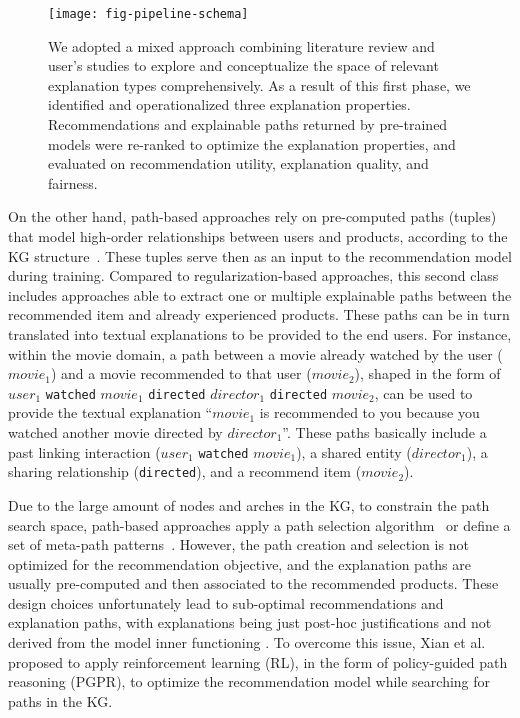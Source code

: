 \documentclass[sigconf]{acmart}
\begin{document}
\begin{figure*}
\centering
\texttt{[image: fig-pipeline-schema]}
\vspace{-8mm}
\caption{We adopted a mixed approach combining literature review and user's studies to explore and conceptualize the space of relevant explanation types comprehensively. As a result of this first phase, we identified and operationalized three explanation properties. Recommendations and explainable paths returned by pre-trained models were re-ranked to optimize the explanation properties, and evaluated on recommendation utility, explanation quality, and fairness.} 
\label{fig:path-img}
\end{figure*}

On the other hand, path-based approaches rely on pre-computed paths (tuples) that model high-order relationships between users and products, according to the KG structure~\cite{he2017neural,ripple-net/10.1145/3269206.3271739, Wang_Wang_Xu_He_Cao_Chua_2019, 10.1145/3219819.3219965,10.1109/TKDE.2018.2833443}.
These tuples serve then as an input to the recommendation model during training. 
Compared to regularization-based approaches, this second class includes approaches able to extract one or multiple explainable paths between the recommended item and already experienced products. 
These paths can be in turn translated into textual explanations to be provided to the end users. 
For instance, within the movie domain, a path between a movie already watched by the user ($movie_1$) and a movie recommended to that user ($movie_2$), shaped in the form of $user_1$ \texttt{watched} $movie_1$ \texttt{directed} $director_1$ \texttt{directed} $movie_2$, can be used to provide the textual explanation ``$movie_1$ is recommended to you because you watched another movie directed by $director_1$''.  These paths basically include a past linking interaction ($user_1$ \texttt{watched} $movie_1$), a shared entity ($director_1$), a sharing relationship (\texttt{directed}), and a recommend item ($movie_2$). 

\vspace{1mm}  
Due to the large amount of nodes and arches in the KG, to constrain the path search space, path-based approaches  apply a path selection algorithm~\cite{he2017neural,ripple-net/10.1145/3269206.3271739, Wang_Wang_Xu_He_Cao_Chua_2019, XianFMMZ19} or define a set of meta-path patterns~\cite{10.1145/3219819.3219965,10.1109/TKDE.2018.2833443}. 
{\color{black} However, the path creation and selection is not optimized for the recommendation objective, and the explanation paths are usually pre-computed and then associated to the recommended products. These design choices unfortunately lead to sub-optimal recommendations and explanation paths, with explanations being just post-hoc justifications and not derived from the model inner functioning \cite{4648950}.}  
To overcome this issue, Xian et al.~\cite{XianFMMZ19} proposed to apply reinforcement learning (RL), in the form of policy-guided path reasoning (PGPR), to optimize the recommendation model while searching for paths in the KG. 
\end{document}
